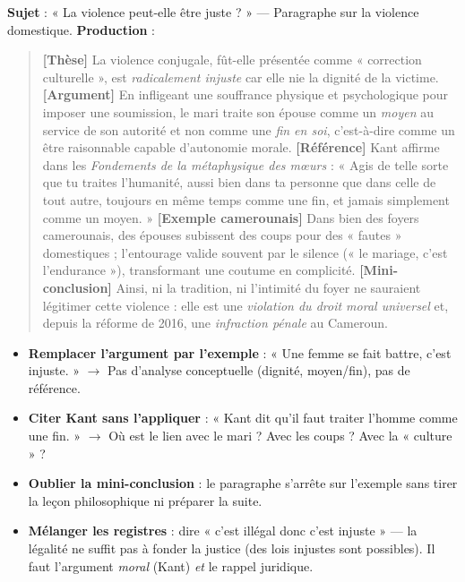 \documentclass[11pt]{article}
\begin{document}
\begin{exoresolu}
\textbf{Sujet} : « La violence peut-elle être juste ? » — Paragraphe sur la violence domestique.
\tcblower
\textbf{Production} :
\begin{quote}
\textbf{[Thèse]} La violence conjugale, fût-elle présentée comme « correction culturelle », est \emph{radicalement injuste} car elle nie la dignité de la victime. \textbf{[Argument]} En infligeant une souffrance physique et psychologique pour imposer une soumission, le mari traite son épouse comme un \emph{moyen} au service de son autorité et non comme une \emph{fin en soi}, c'est-à-dire comme un être raisonnable capable d'autonomie morale. \textbf{[Référence]} Kant affirme dans les \emph{Fondements de la métaphysique des mœurs} : « Agis de telle sorte que tu traites l'humanité, aussi bien dans ta personne que dans celle de tout autre, toujours en même temps comme une fin, et jamais simplement comme un moyen. » \textbf{[Exemple camerounais]} Dans bien des foyers camerounais, des épouses subissent des coups pour des « fautes » domestiques ; l'entourage valide souvent par le silence (« le mariage, c'est l'endurance »), transformant une coutume en complicité. \textbf{[Mini-conclusion]} Ainsi, ni la tradition, ni l'intimité du foyer ne sauraient légitimer cette violence : elle est une \emph{violation du droit moral universel} et, depuis la réforme de 2016, une \emph{infraction pénale} au Cameroun.
\end{quote}
\end{exoresolu}

\begin{attention}
\begin{itemize}
\item \textbf{Remplacer l'argument par l'exemple} : « Une femme se fait battre, c'est injuste. » $\rightarrow$ Pas d'analyse conceptuelle (dignité, moyen/fin), pas de référence.
\item \textbf{Citer Kant sans l'appliquer} : « Kant dit qu'il faut traiter l'homme comme une fin. » $\rightarrow$ Où est le lien avec le mari ? Avec les coups ? Avec la « culture » ?
\item \textbf{Oublier la mini-conclusion} : le paragraphe s'arrête sur l'exemple sans tirer la leçon philosophique ni préparer la suite.
\item \textbf{Mélanger les registres} : dire « c'est illégal donc c'est injuste » — la légalité ne suffit pas à fonder la justice (des lois injustes sont possibles). Il faut l'argument \emph{moral} (Kant) \emph{et} le rappel juridique.
\end{itemize}
\end{attention}
\end{document}
